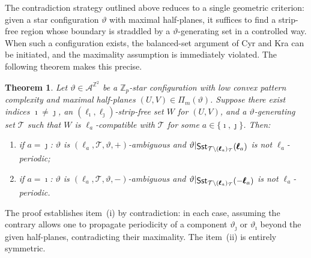 \documentclass[12pt]{amsart}
\numberwithin{equation}{section}
\newtheorem{theorem}{Theorem}[section]
\DeclareMathOperator{\sst}{\mathsf{Sst}}
\newcommand{\bb}[1]{\mathbb{#1}}
\newcommand{\sob}[1]{\ensuremath{{\mathbin |}\raise-.4ex\hbox{$#1$}}}
\begin{document}
The contradiction strategy outlined above reduces to a single geometric criterion: given a star configuration $ \vartheta $ with maximal half-planes, it suffices to find a strip-free region whose boundary is straddled by a $\vartheta$-generating set in a controlled way. When such a configuration exists, the balanced-set argument of Cyr and Kra can be initiated, and the maximality assumption is immediately violated. The following theorem makes this precise. 

\begin{theorem}\label{thm:main general theorem}
Let $\vartheta \in \mathcal{A}^{\bb{Z}^2}$ be a $\bb{Z}_p$-star configuration with low convex pattern complexity and maximal half-planes $(U,V) \in \Pi_m(\vartheta)$.
Suppose there exist indices $\imath\neq\jmath$, an $(\pmb{\ell}_{\imath},\pmb{\ell}_{\jmath})$-strip-free set $W $ for $(U,V)$, and a $\vartheta$-generating set $\mathcal T$ such that $ W $ is $\pmb{\ell}_a$-compatible with $ \mathcal{T} $ for some $a \in \{\imath,\jmath\}$. Then:
\begin{enumerate}[label=(\roman*)]\setlength{\itemsep}{5pt}
	\item if $a = \jmath$: $\vartheta$ is $(\pmb{\ell}_a,\mathcal{T},\vartheta,+)$-ambiguous and $\vartheta\sob{\sst_{\mathcal{T} \setminus (\pmb{\ell}_a)_{\mathcal{T}}}(\pmb{\ell}_a)}$ is not $\ell_a$-periodic;
    
    \item if $a = \imath$: $\vartheta$ is $(\pmb{\ell}_a,\mathcal{T},\vartheta,-)$-ambiguous and $\vartheta\sob{\sst_{\mathcal{T} \setminus (\pmb{\ell}_a)_{\mathcal{T}}}(-\pmb{\ell}_a)}$ is not $\ell_a$-periodic.
\end{enumerate} 
\end{theorem}

The proof establishes item~(i) by contradiction: in each case, assuming the contrary allows one to propagate periodicity of a component $ \vartheta_\jmath $ or $ \vartheta_\imath $ beyond the given half-planes, contradicting their maximality. The item~(ii) is entirely symmetric.
\end{document}
